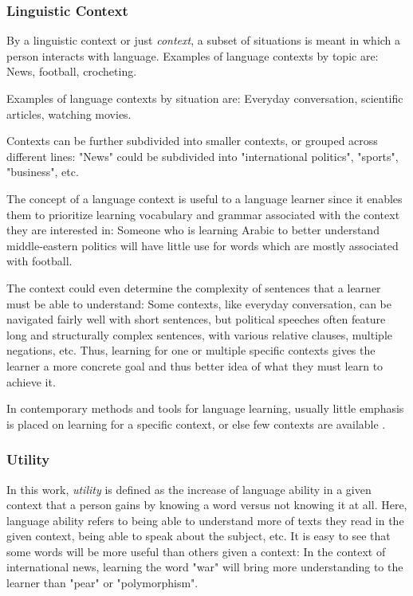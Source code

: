 \subsubsection{Linguistic Context}
By a linguistic context or just \textit{context}, a subset of situations is meant in which a person interacts with language.
Examples of language contexts by topic are:
News, football, crocheting.

Examples of language contexts by situation are:
Everyday conversation, scientific articles, watching movies.

Contexts can be further subdivided into smaller contexts, or grouped across different lines:
"News" could be subdivided into "international politics", "sports", "business", etc.

The concept of a language context is useful to a language learner since it enables them to prioritize learning vocabulary and grammar associated with the context they are interested in:
Someone who is learning Arabic to better understand middle-eastern politics will have little use for words which are mostly associated with football.

The context could even determine the complexity of sentences that a learner must be able to understand:
Some contexts, like everyday conversation, can be navigated fairly well with short sentences, but political speeches often feature long and structurally complex sentences, with various relative clauses, multiple negations, etc. 
Thus, learning for one or multiple specific contexts gives the learner a more concrete goal and thus better idea of what they must learn to achieve it.

In contemporary methods and tools for language learning, usually little emphasis is placed on learning for a specific context, or else few contexts are available .

\subsubsection{Utility}
In this work, \textit{utility} is defined as the increase of language ability in a given context that a person gains by knowing a word versus not knowing it at all.
Here, language ability refers to being able to understand more of texts they read in the given context, being able to speak about the subject, etc.
It is easy to see that some words will be more useful than others given a context:
In the context of international news, learning the word "war" will bring more understanding to the learner than "pear" or "polymorphism".

